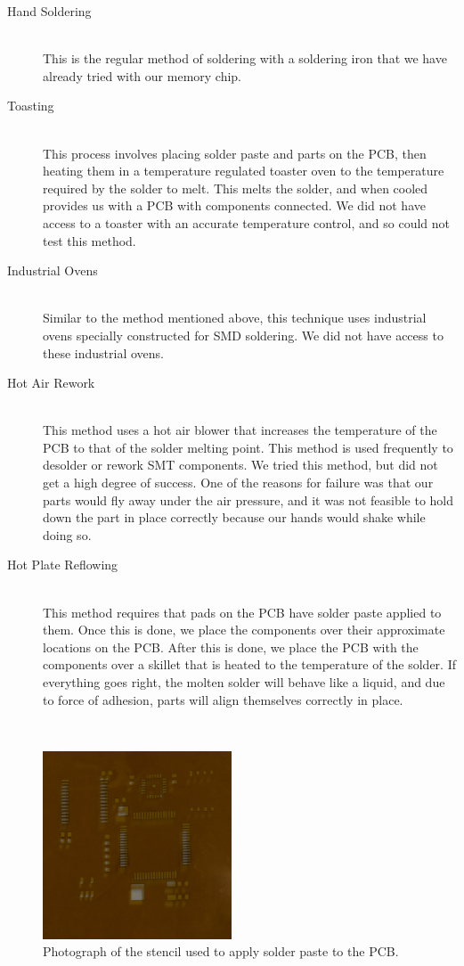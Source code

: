 \begin{description}

	\item[Hand Soldering] \hfill \\
	This is the regular method of soldering with a soldering iron that we have already tried with our memory chip.
	\item[Toasting] \hfill \\
	This process involves placing solder paste and parts on the PCB,
	then heating them in a temperature regulated toaster oven to the temperature required by the solder to melt.
	This melts the solder, and when cooled provides us with a PCB with components connected.
	We did not have access to a toaster with an accurate temperature control,
	and so could not test this method.
	\item[Industrial Ovens] \hfill \\
	Similar to the method mentioned above,
	this technique uses industrial ovens specially constructed for SMD soldering.
	We did not have access to these industrial ovens.
	\item[Hot Air Rework] \hfill \\
	This method uses a hot air blower that increases the temperature of the PCB to that of the solder melting point.
	This method is used frequently to desolder or rework SMT components.
	We tried this method,
	but did not get a high degree of success.
	One of the reasons for failure was that our parts would fly away under the air pressure,
	and it was not feasible to hold down the part in place correctly because our hands would shake while doing so.
	\item[Hot Plate Reflowing] \hfill \\
	This method requires that pads on the PCB have solder paste applied to them.
	Once this is done,
	we place the components over their approximate locations on the PCB.
	After this is done,
	we place the PCB with the components over a skillet that is heated to the temperature of the solder.
	If everything goes right,
	the molten solder will behave like a liquid,
	and due to force of adhesion,
	parts will align themselves correctly in place.
\end{description}
\hfill \\
\begin{figure}
\begin{center}
\includegraphics[width=0.5\textwidth]{images/stencil.jpg}
\caption{Photograph of the stencil used to apply solder paste to the PCB.}
\label{Fig:Stencil}
\end{center}
\end{figure}
